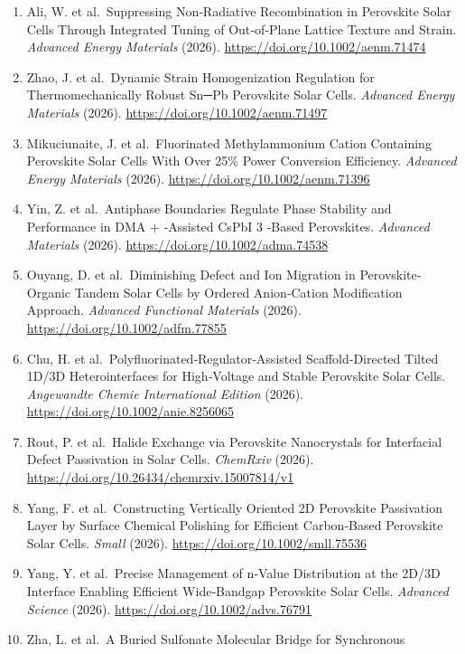 \documentclass[
  11pt,
]{article}
\begin{document}
\begin{enumerate}
{  Review} (2026). \url{https://doi.org/10.1093/nsr/nwag484}
\item
  Ali, W. et al.~Suppressing Non‐Radiative Recombination in Perovskite
  Solar Cells Through Integrated Tuning of Out‐of‐Plane Lattice Texture
  and Strain. \emph{Advanced Energy Materials} (2026).
  \url{https://doi.org/10.1002/aenm.71474}
\item
  Zhao, J. et al.~Dynamic Strain Homogenization Regulation for
  Thermomechanically Robust Sn─Pb Perovskite Solar Cells. \emph{Advanced
  Energy Materials} (2026). \url{https://doi.org/10.1002/aenm.71497}
\item
  Mikuciunaite, J. et al.~Fluorinated Methylammonium Cation Containing
  Perovskite Solar Cells With Over 25\% Power Conversion Efficiency.
  \emph{Advanced Energy Materials} (2026).
  \url{https://doi.org/10.1002/aenm.71396}
\item
  Yin, Z. et al.~Antiphase Boundaries Regulate Phase Stability and
  Performance in DMA + ‐Assisted CsPbI 3 ‐Based Perovskites.
  \emph{Advanced Materials} (2026).
  \url{https://doi.org/10.1002/adma.74538}
\item
  Ouyang, D. et al.~Diminishing Defect and Ion Migration in
  Perovskite‐Organic Tandem Solar Cells by Ordered Anion‐Cation
  Modification Approach. \emph{Advanced Functional Materials} (2026).
  \url{https://doi.org/10.1002/adfm.77855}
\item
  Chu, H. et al.~Polyfluorinated‐Regulator‐Assisted Scaffold‐Directed
  Tilted 1D/3D Heterointerfaces for High‐Voltage and Stable Perovskite
  Solar Cells. \emph{Angewandte Chemie International Edition} (2026).
  \url{https://doi.org/10.1002/anie.8256065}
\item
  Rout, P. et al.~Halide Exchange via Perovskite Nanocrystals for
  Interfacial Defect Passivation in Solar Cells. \emph{ChemRxiv} (2026).
  \url{https://doi.org/10.26434/chemrxiv.15007814/v1}
\item
  Yang, F. et al.~Constructing Vertically Oriented 2D Perovskite
  Passivation Layer by Surface Chemical Polishing for Efficient
  Carbon‐Based Perovskite Solar Cells. \emph{Small} (2026).
  \url{https://doi.org/10.1002/smll.75536}
\item
  Yang, Y. et al.~Precise Management of n‐Value Distribution at the
  2D/3D Interface Enabling Efficient Wide‐Bandgap Perovskite Solar
  Cells. \emph{Advanced Science} (2026).
  \url{https://doi.org/10.1002/advs.76791}
\item
  Zha, L. et al.~A Buried Sulfonate Molecular Bridge for Synchronous

\end{enumerate}
\end{document}
